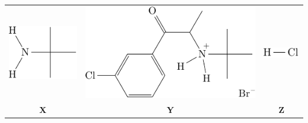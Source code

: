 \documentclass{article}
\begin{document}
	\begin{tabular}{ccc}
		\includegraphics{subfigures/t-butylamine.pdf} & \includegraphics{subfigures/intermediate-Y.pdf} & \includegraphics{subfigures/hcl.pdf} \\
		\textbf{X} & \textbf{Y} & \textbf{Z}
	\end{tabular}
\end{document}
